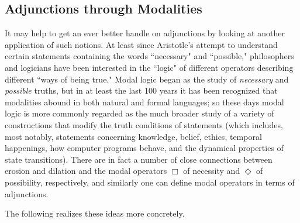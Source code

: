 \documentclass[a4paper]{book}
\theoremstyle{definition}
\theoremstyle{definition}
\theoremstyle{definition}
\theoremstyle{theorem}
\theoremstyle{definition}
\begin{document}
\subsection{Adjunctions through Modalities}\label{section: modalities}
It may help to get an ever better handle on adjunctions by looking at another application of such notions. At least since Aristotle's attempt to understand certain statements containing the words ``necessary" and ``possible," philosophers and logicians have been interested in the ``logic" of different operators describing different ``ways of being true." Modal logic began as the study of \textit{necessary} and \textit{possible} truths, but in at least the last 100 years it has been recognized that modalities abound in both natural and formal languages; so these days modal logic is more commonly regarded as the much broader study of a variety of constructions that modify the truth conditions of statements (which includes, most notably, statements concerning knowledge, belief, ethics, temporal happenings, how computer programs behave, and the dynamical properties of state transitions). There are in fact a number of close connections between erosion and dilation and the modal operators $\Box$ of necessity and $\Diamond$ of possibility, respectively, and similarly one can define modal operators in terms of adjunctions. \par 
The following realizes these ideas more concretely. 
\end{document}
